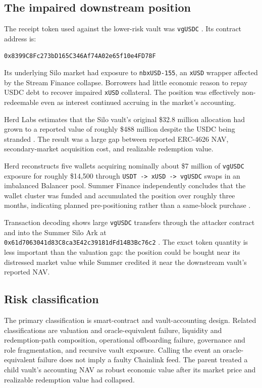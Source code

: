 \documentclass[11pt]{article}
\begin{document}
\subsection{The impaired downstream position}

The receipt token used against the lower-risk vault was \texttt{vgUSDC} \cite{vgusdc-contract}.  Its contract address is:
\begin{center}
    \nolinkurl{0x8399C8Fc273bD165C346Af74A02e65f10e4FD78F}
\end{center}
Its underlying Silo market had exposure to \texttt{nbxUSD-155}, an \texttt{xUSD} wrapper affected by the Stream Finance collapse.  Borrowers had little economic reason to repay USDC debt to recover impaired \texttt{xUSD} collateral.  The position was effectively non-redeemable even as interest continued accruing in the market's accounting.

Herd Labs estimates that the Silo vault's original \$32.8 million allocation had grown to a reported value of roughly \$488 million despite the USDC being stranded \cite{herd-analysis}.  The result was a large gap between reported ERC-4626 NAV, secondary-market acquisition cost, and realizable redemption value.

Herd reconstructs five wallets acquiring nominally about \$7 million of \texttt{vgUSDC} exposure for roughly \$14,500 through \texttt{USDT -> xUSD -> vgUSDC} swaps in an imbalanced Balancer pool.  Summer Finance independently concludes that the wallet cluster was funded and accumulated the position over roughly three months, indicating planned pre-positioning rather than a same-block purchase \cite{summer-postmortem}.

Transaction decoding shows large \texttt{vgUSDC} transfers through the attacker contract and into the Summer Silo Ark at \nolinkurl{0x61d7063041d83C8ca3E42c39181dFd14B3Bc76c2} \cite{blockscout-transaction}.  The exact token quantity is less important than the valuation gap: the position could be bought near its distressed market value while Summer credited it near the downstream vault's reported NAV.

\subsection{Risk classification}

The primary classification is smart-contract and vault-accounting design.  Related classifications are valuation and oracle-equivalent failure, liquidity and redemption-path composition, operational offboarding failure, governance and role fragmentation, and recursive vault exposure.  Calling the event an oracle-equivalent failure does not imply a faulty Chainlink feed.  The parent treated a child vault's accounting NAV as robust economic value after its market price and realizable redemption value had collapsed.
\end{document}
